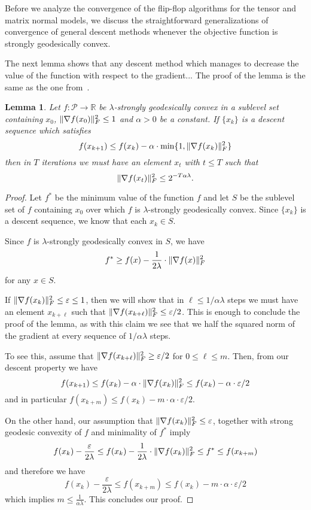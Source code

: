 \documentclass[aos]{imsart}
\newtheorem{lemma}[theorem]{Lemma}
\theoremstyle{definition}
\DeclarePairedDelimiter{\norm}{\lVert}{\rVert}
\newcommand{\R}{{\mathbb{R}}}
\newcommand{\SPD}{\mathcal{P}}
\begin{document}
Before we analyze the convergence of the flip-flop algorithms for the tensor and matrix normal models, we discuss the straightforward generalizations of convergence of general descent methods whenever the objective function is strongly geodesically convex.

The next lemma shows that any descent method which manages to decrease the value of the function with respect to the gradient...
The proof of the lemma is the same as the one from~\cite[Lemma 4.8]{FM20}.

\begin{lemma}\label{lem:descent-sublevel-set}
	Let $f : \SPD \rightarrow \R$ be $\lambda$-strongly geodesically convex in a sublevel set containing $x_0$, $\norm{\nabla f(x_0)}_F^2 \leq 1$ and $\alpha > 0$ be a constant.
	If $\{x_k\}$ is a descent sequence which satisfies
	$$ f(x_{k+1}) \leq f(x_k) - \alpha \cdot \min\{1,  \norm{\nabla f(x_k)}^2_F \} $$
	then in $T$ iterations we must have an element $x_t$ with $t\leq T$ such that
	$$ \norm{\nabla f(x_t)}^2_F \leq 2^{-T \alpha \lambda}.   $$
\end{lemma}

\begin{proof}
	Let $f^*$ be the minimum value of the function $f$ and let $S$ be the sublevel set of $f$ containing $x_0$ over which $f$ is $\lambda$-strongly geodesically convex. Since $\{x_k\}$ is a descent sequence, we know that each $x_k \in S$.

	Since $f$ is $\lambda$-strongly geodesically convex in $S$, we have
	$$ f^* \geq f(x) - \frac{1}{2\lambda} \cdot \norm{\nabla f(x)}_F^2 $$
	for any $x \in S$.

	If $\norm{\nabla f(x_k)}_F^2 \leq \varepsilon \leq 1$, then we will show that in $\ell \leq 1/\alpha \lambda$ steps we must have an element $x_{k+\ell}$ such that $\norm{\nabla f(x_{k + \ell})}_F^2 \leq \varepsilon/2$. This is enough to conclude the proof of the lemma, as with this claim we see that we half the squared norm of the gradient at every sequence of $1/\alpha \lambda$ steps.

	To see this, assume that $\norm{\nabla f(x_{k+\ell})}_F^2 \geq \varepsilon/2$ for $0 \leq \ell \leq m$. Then, from our descent property we have
	$$ f(x_{k+1}) \leq f(x_k) - \alpha \cdot \norm{\nabla f(x_k)}^2_F \leq f(x_k) - \alpha \cdot \varepsilon/2$$
	and in particular $f(x_{k + m}) \leq f(x_k) - m \cdot \alpha \cdot \varepsilon/2$.

	On the other hand, our assumption that $\norm{\nabla f(x_k)}_F^2 \leq \varepsilon$, together with strong geodesic convexity of $f$ and minimality of $f^*$ imply
	$$ f(x_{k}) - \frac{\varepsilon}{2\lambda} \leq f(x_{k}) - \frac{1}{2\lambda} \cdot \norm{\nabla f(x_k)}_F^2 \leq f^* \leq f(x_{k+m}) $$
	and therefore we have
	$$ f(x_{k}) - \frac{\varepsilon}{2\lambda} \leq f(x_{k + m}) \leq f(x_k) - m \cdot \alpha \cdot \varepsilon/2 $$
	which implies $m \leq \frac{1}{\alpha \lambda}$. This concludes our proof.
\end{proof}
\end{document}
